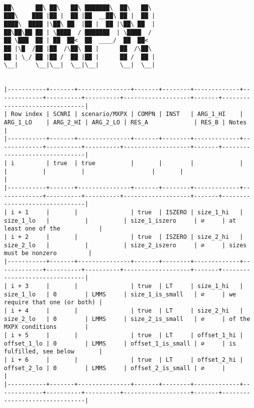 \documentclass[varwidth=\maxdimen,margin=0.5cm,multi={verbatim}]{standalone}
\begin{document}
\begin{verbatim}

██\      ██\ ██\   ██\ ███████\  ██\   ██\
███\    ███ |██ |  ██ |██  __██\ ██ |  ██ |
████\  ████ |\██\ ██  |██ |  ██ |\██\ ██  |
██\██\██ ██ | \████  / ███████  | \████  /
██ \███  ██ | ██  ██<  ██  ____/  ██  ██<
██ |\█  /██ |██  /\██\ ██ |      ██  /\██\
██ | \_/ ██ |██ /  ██ |██ |      ██ /  ██ |
\__|     \__|\__|  \__|\__|      \__|  \__|


|-----------+-------+---------------+-------+--------+-------------+-------------+----------+----------+-------------------+-------+-------------------------------|
| Row index | SCNRI | scenario/MXPX | COMPN | INST   | ARG_1_HI    | ARG_1_LO    | ARG_2_HI | ARG_2_LO | RES_A             | RES_B | Notes                         |
|-----------+-------+---------------+-------+--------+-------------+-------------+----------+----------+-------------------+-------+-------------------------------|
| i         | true  | true          |       |        |             |             |          |          |                   |       |                               |
|-----------+-------+---------------+-------+--------+-------------+-------------+----------+----------+-------------------+-------+-------------------------------|
| i + 1     |       |               | true  | ISZERO | size_1_hi   | size_1_lo   |          |          | size_1_iszero     | ∅     | at least one of the           |
| i + 2     |       |               | true  | ISZERO | size_2_hi   | size_2_lo   |          |          | size_2_iszero     | ∅     | sizes must be nonzero         |
|-----------+-------+---------------+-------+--------+-------------+-------------+----------+----------+-------------------+-------+-------------------------------|
| i + 3     |       |               | true  | LT     | size_1_hi   | size_1_lo   | 0        | LMMS     | size_1_is_small   | ∅     | we require that one (or both) |
| i + 4     |       |               | true  | LT     | size_2_hi   | size_2_lo   | 0        | LMMS     | size_2_is_small   | ∅     | of the MXPX conditions        |
| i + 5     |       |               | true  | LT     | offset_1_hi | offset_1_lo | 0        | LMMS     | offset_1_is_small | ∅     | is fulfilled, see below       |
| i + 6     |       |               | true  | LT     | offset_2_hi | offset_2_lo | 0        | LMMS     | offset_2_is_small | ∅     |                               |
|-----------+-------+---------------+-------+--------+-------------+-------------+----------+----------+-------------------+-------+-------------------------------|


\end{verbatim}
\end{document}
